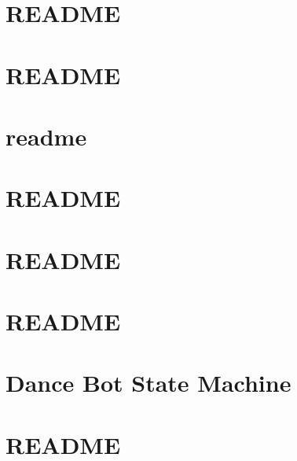 \let\mypdfximage\pdfximage\def\pdfximage{\immediate\mypdfximage}\documentclass[twoside]{book}
\newcommand{\+}{\discretionary{\mbox{\scriptsize$\hookleftarrow$}}{}{}}
\begin{document}
\chapter{R\+E\+A\+D\+ME}
\label{md_smacc_client_library_ros_publisher_client_README}

\chapter{R\+E\+A\+D\+ME}
\label{md_smacc_client_library_ros_timer_client_README}

\chapter{readme}
\label{md_smacc_diagnostics_readme}

\chapter{R\+E\+A\+D\+ME}
\label{md_smacc_sm_reference_library_sm_atomic_README}

\chapter{R\+E\+A\+D\+ME}
\label{md_smacc_sm_reference_library_sm_atomic_cb_README}

\chapter{R\+E\+A\+D\+ME}
\label{md_smacc_sm_reference_library_sm_calendar_week_README}

\chapter{Dance Bot State Machine}
\label{md_smacc_sm_reference_library_sm_dance_bot_launch_readme}

\chapter{R\+E\+A\+D\+ME}
\label{md_smacc_sm_reference_library_sm_dance_bot_README}

\end{document}

